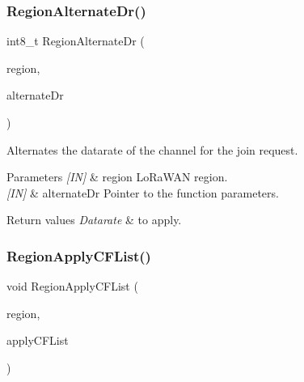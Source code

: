 \subsubsection{\texorpdfstring{Region\+Alternate\+Dr()}{RegionAlternateDr()}}
{\footnotesize\ttfamily int8\+\_\+t Region\+Alternate\+Dr (\begin{DoxyParamCaption}\item[{\hyperlink{group__LORAMAC_ga80c48efda9ae02e14b58160d34a798dd}{Lo\+Ra\+Mac\+Region\+\_\+t}}]{region,  }\item[{\hyperlink{group__REGION_ga001ea4338d1c83f4c785b49d7ad2d696}{Alternate\+Dr\+Params\+\_\+t} $\ast$}]{alternate\+Dr }\end{DoxyParamCaption})}



Alternates the datarate of the channel for the join request. 


\begin{DoxyParams}{Parameters}
{\em \mbox{[}\+I\+N\mbox{]}} & region Lo\+Ra\+W\+AN region.\\
\hline
{\em \mbox{[}\+I\+N\mbox{]}} & alternate\+Dr Pointer to the function parameters.\\
\hline
\end{DoxyParams}

\begin{DoxyRetVals}{Return values}
{\em Datarate} & to apply. \\
\hline
\end{DoxyRetVals}
\mbox{\label{group__REGION_gae3fdd82182ebb0704adb2a017d30e1f2}} 
\subsubsection{\texorpdfstring{Region\+Apply\+C\+F\+List()}{RegionApplyCFList()}}
{\footnotesize\ttfamily void Region\+Apply\+C\+F\+List (\begin{DoxyParamCaption}\item[{\hyperlink{group__LORAMAC_ga80c48efda9ae02e14b58160d34a798dd}{Lo\+Ra\+Mac\+Region\+\_\+t}}]{region,  }\item[{\hyperlink{group__REGION_ga71588e9ad07e34b78fa91d51881fd3c6}{Apply\+C\+F\+List\+Params\+\_\+t} $\ast$}]{apply\+C\+F\+List }\end{DoxyParamCaption})}



